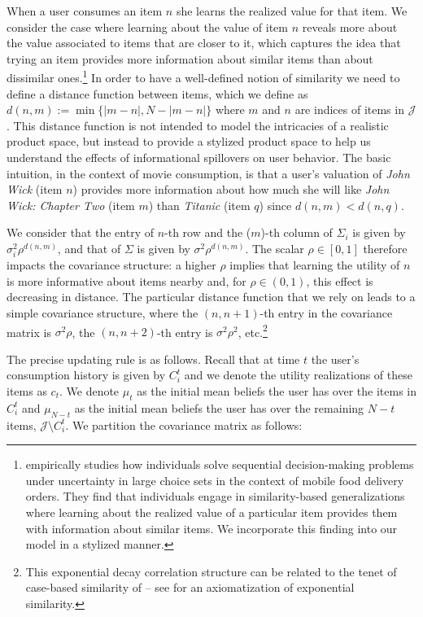 \documentclass[manuscript, nonacm]{acmart}
\newcommand{\xhdr}[1]{\vspace{1mm} \noindent{\bf #1}}
\begin{document}
\xhdr{User Learning.}
When a user consumes an item $n$ she learns the realized value for that item. We consider the case where  learning about the value of item $n$ reveals more about the value associated to items that are closer to it, which captures the idea that trying an item provides more information about similar items than about dissimilar ones.\footnote{\cite{schulz2019structured} empirically studies how individuals solve sequential decision-making problems under uncertainty in large choice sets in the context of mobile food delivery orders. They find that individuals engage in similarity-based generalizations where learning about the realized value of a particular item provides them with information about similar items. We incorporate this finding into our model in a stylized manner.} In order to have a well-defined notion of similarity we need to define a distance function between items, which we define as $d(n,m):=\min\{ \lvert m - n \rvert ,N - \lvert m - n \rvert \}$ where $m$ and $n$ are indices of items in $\mathcal{J}$. This distance function is not intended to model the intricacies of a realistic product space, but instead to provide a stylized product space to help us understand the effects of informational spillovers on user behavior. The basic intuition, in the context of movie consumption, is that a user's valuation of \textit{John Wick} (item $n$) provides more information about how much she will like \textit{John Wick: Chapter Two} (item $m$) than \textit{Titanic} (item $q$) since $d(n, m) < d(n, q)$. 
\par
We consider that the entry of $n$-th row and the ($m$)-th column of $\Sigma_i$ is given by $\sigma_i^2 \rho^{d(n,m)}$, and that of $\Sigma$ is given by $\sigma^2 \rho^{d(n,m)}$. The scalar $\rho \in [0,1]$ therefore impacts the covariance structure: a higher $\rho$ implies that learning the utility of $n$ is more informative about items nearby and, for $\rho \in (0,1)$, this effect is decreasing in distance. The particular distance function that we rely on leads to a simple covariance structure, where the $(n,n+1)$-th entry in the covariance matrix is $\sigma^{2} \rho$, the $(n,n+2)$-th entry is $\sigma^{2} \rho^2$, etc.\footnote{This exponential decay correlation structure can be related to the tenet of case-based similarity of \cite{gilboa1995case} -- see \cite{billot2008axiomatization} for an axiomatization of exponential similarity.}
\par
The precise updating rule is as follows. Recall that at time $t$ the user's consumption history is given by $C_{i}^{t}$ and we denote the utility realizations of these items as $c_t$. We denote $\mu_t$ as the initial mean beliefs the user has over the items in $C_{i}^{t}$ and $\mu_{N-t}$ as the initial mean beliefs the user has over the remaining $N-t$ items, $\mathcal{J} \setminus C_{i}^{t}$. We partition the covariance matrix as follows:
\end{document}
